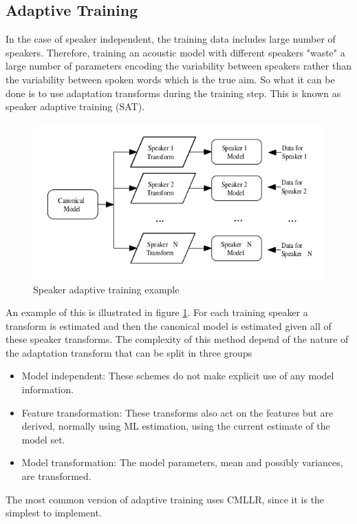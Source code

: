 \subsection{Adaptive Training}\label{at}
In the case of speaker independent, the training data includes large number of speakers. Therefore, training an acoustic model with different speakers "waste" a large number of parameters encoding the variability between speakers rather than the variability between spoken words which is the true aim. So what it can be done is to use adaptation transforms during the training step. This is known as speaker adaptive training (SAT).
\begin{figure} [htb]
	\begin{center}
	\includegraphics[width=1\textwidth]{img/sat2.png}
	\end{center}
	\caption{\label{satimg}Speaker adaptive training example \cite{hmmasr}}
\end{figure}
An example of this is illustrated in figure \ref{satimg}. For each training speaker a transform is estimated and then the canonical model is estimated given all of these speaker transforms. The complexity of this method depend of the nature of the adaptation transform that can be split in three groups \cite{hmmasr}
\begin{itemize}
	\item Model independent: These schemes do not make explicit use of any model information.
	\item Feature transformation: These transforms also act on the features but are derived, normally using ML estimation, using the current estimate of the model set.
	\item Model transformation: The model parameters, mean and possibly variances, are transformed.
\end{itemize}
The most common version of adaptive training uses CMLLR, since it is the simplest to implement.